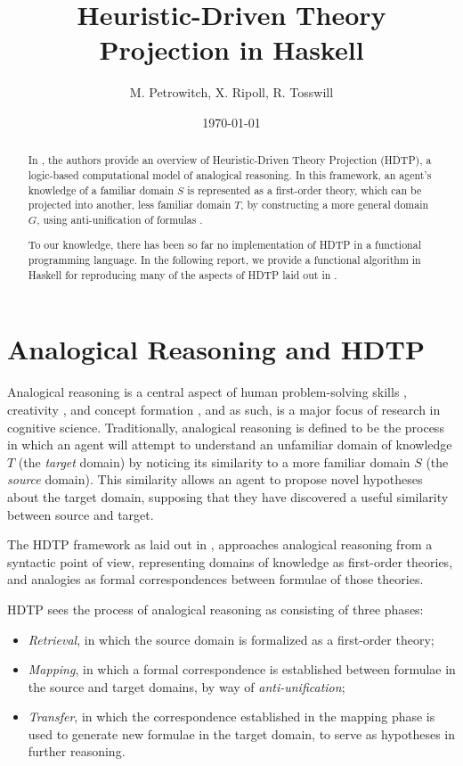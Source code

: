 \documentclass[12pt,a4paper]{article}
\title{Heuristic-Driven Theory Projection in Haskell}
\author{M. Petrowitch, X. Ripoll, R. Tosswill}
\date{\today}
\begin{document}
\maketitle

\begin{abstract}
In \cite{Schmidt-2014}, the authors provide an overview of Heuristic-Driven
Theory Projection (HDTP), a logic-based computational model of analogical
reasoning. In this framework, an agent's knowledge of a familiar domain $S$ is
represented as a first-order theory, which can be projected into another, less
familiar domain $T$, by constructing a more general domain $G$, using
anti-unification of formulas \cite{Plotkin70}. 

To our knowledge, there has been so far no implementation of HDTP in a functional programming language. In the following report, we provide a functional algorithm in Haskell for reproducing many of the aspects of HDTP laid out in \cite{Schmidt-2014}.
\end{abstract}

\vfill

\tableofcontents


\section{Analogical Reasoning and HDTP}
Analogical reasoning is a central aspect of human problem-solving skills
\cite{gentner}, creativity \cite{Besold2015GeneralizeAB}, and concept
formation \cite{hofstadter2013surfaces}, and as such, is a major focus of
research in cognitive science. Traditionally, analogical reasoning is defined to be the process in which an agent will attempt to understand an unfamiliar domain of knowledge $T$ (the \textit{target} domain) by noticing its similarity to a more familiar domain $S$ (the \textit{source} domain). This similarity allows an agent to propose novel hypotheses about the target domain, supposing that they have discovered a useful similarity between source and target.

The HDTP framework as laid out in \cite{Schmidt-2014}, approaches analogical reasoning from a syntactic point of view, representing domains of knowledge as first-order theories, and analogies as formal correspondences between formulae of those theories. 

HDTP sees the process of analogical reasoning as consisting of three phases: 
\begin{itemize}
    \item \textit{Retrieval}, in which the source domain is formalized as a first-order theory;
    \item \textit{Mapping}, in which a formal correspondence is established between formulae in the source and target domains, by way of \textit{anti-unification};
    \item \textit{Transfer}, in which the correspondence established in the mapping phase is used to generate new formulae in the target domain, to serve as hypotheses in further reasoning.
\end{itemize} 
\end{document}

